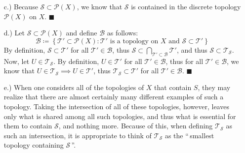 \documentclass[11pt]{article}
\newcommand{\braces}[1]{\left\{#1\right\}}           %
\begin{document}
\begin{itemize}
    \item [c.)] Because
    $\mathcal{S}\subset\mathcal{P}(X)$,
    we know that
    $\mathcal{S}$
    is contained in the discrete topology
    $\mathcal{P}(X)$
    on
    $X$. 
    $\blacksquare$

    \item [d.)] Let $\mathcal{S}\subset\mathcal{P}(X)$ and define
    $\mathcal{B}$
    as follows:
    \[
    \mathcal{B}\coloneqq\braces{
        \mathcal{T}'\subset\mathcal{P}(X):
        \mathcal{T}'\text{ is a topology on }X
        \text{ and }\mathcal{S}\subset\mathcal{T}'
    }
    \]
    By definition,
    $\mathcal{S}\subset\mathcal{T}'$
    for all
    $\mathcal{T}'\in\mathcal{B}$,
    thus
    $\mathcal{S}\subset
    \displaystyle\bigcap_{\mathcal{T}'\subset\mathcal{B}}\mathcal{T}'$,
    and thus
    $\mathcal{S}\subset\mathcal{T}_\mathcal{S}$.
    Now, let
    $U\in\mathcal{T}_\mathcal{S}$.
    By definition,
    $U\in\mathcal{T}'$
    for all
    $\mathcal{T}'\in\mathcal{B}$,
    thus for all
    $\mathcal{T}'\in\mathcal{B}$,
    we know that
    $U\in\mathcal{T}_\mathcal{S}\implies U\in\mathcal{T}'$,
    thus
    $\mathcal{T}_\mathcal{S}\subset\mathcal{T}'$
    for all
    $\mathcal{T}'\in\mathcal{B}$.
    $\blacksquare$

    \item [e.)] When one considers all of the topologies of $X$ that contain $S$, they may realize that there are almost certainly many different examples of such a topology. Taking the intersection of all of these topologies, however, leaves only what is shared among all such topologies, and thus what is essential for them to contain $\mathcal{S}$, and nothing more. Because of this, when defining $\mathcal{T}_\mathcal{S}$ as such an intersection, it is appropriate to think of $\mathcal{T}_\mathcal{S}$ as the ``\,smallest topology containing $\mathcal{S}$\,''.

\end{itemize}
\end{document}
